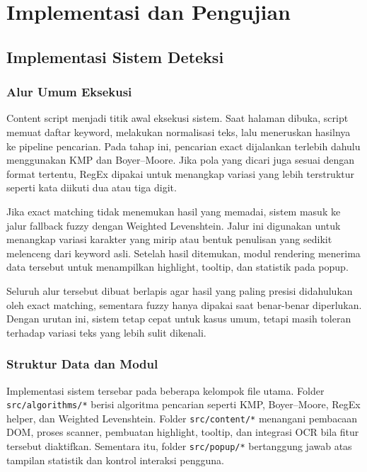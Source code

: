 \section{Implementasi dan Pengujian}

\subsection{Implementasi Sistem Deteksi}

\subsubsection{Alur Umum Eksekusi}
Content script menjadi titik awal eksekusi sistem. Saat halaman dibuka, script memuat daftar keyword, melakukan normalisasi teks, lalu meneruskan hasilnya ke pipeline pencarian. Pada tahap ini, pencarian exact dijalankan terlebih dahulu menggunakan KMP dan Boyer--Moore. Jika pola yang dicari juga sesuai dengan format tertentu, RegEx dipakai untuk menangkap variasi yang lebih terstruktur seperti kata diikuti dua atau tiga digit.

Jika exact matching tidak menemukan hasil yang memadai, sistem masuk ke jalur fallback fuzzy dengan Weighted Levenshtein. Jalur ini digunakan untuk menangkap variasi karakter yang mirip atau bentuk penulisan yang sedikit melenceng dari keyword asli. Setelah hasil ditemukan, modul rendering menerima data tersebut untuk menampilkan highlight, tooltip, dan statistik pada popup.

Seluruh alur tersebut dibuat berlapis agar hasil yang paling presisi didahulukan oleh exact matching, sementara fuzzy hanya dipakai saat benar-benar diperlukan. Dengan urutan ini, sistem tetap cepat untuk kasus umum, tetapi masih toleran terhadap variasi teks yang lebih sulit dikenali.

\subsubsection{Struktur Data dan Modul}
Implementasi sistem tersebar pada beberapa kelompok file utama. Folder \texttt{src/algorithms/*} berisi algoritma pencarian seperti KMP, Boyer--Moore, RegEx helper, dan Weighted Levenshtein. Folder \texttt{src/content/*} menangani pembacaan DOM, proses scanner, pembuatan highlight, tooltip, dan integrasi OCR bila fitur tersebut diaktifkan. Sementara itu, folder \texttt{src/popup/*} bertanggung jawab atas tampilan statistik dan kontrol interaksi pengguna.

